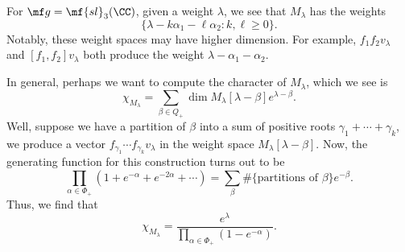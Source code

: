 \documentclass[../notes.tex]{subfiles}
\begin{document}
\begin{example}
	For $\mf g=\mf{sl}_3(\CC)$, given a weight $\lambda$, we see that $M_\lambda$ has the weights
	\[\{\lambda-k\alpha_1-\ell\alpha_2:k,\ell\ge0\}.\]
	Notably, these weight spaces may have higher dimension. For example, $f_1f_2v_\lambda$ and $[f_1,f_2]v_\lambda$ both produce the weight $\lambda-\alpha_1-\alpha_2$.
\end{example}
In general, perhaps we want to compute the character of $M_\lambda$, which we see is
\[\chi_{M_\lambda}=\sum_{\beta\in Q_+}\dim M_\lambda[\lambda-\beta]e^{\lambda-\beta}.\]
Well, suppose we have a partition of $\beta$ into a sum of positive roots $\gamma_1+\cdots+\gamma_k$, we produce a vector $f_{\gamma_1}\cdots f_{\gamma_k}v_\lambda$ in the weight space $M_\lambda[\lambda-\beta]$. Now, the generating function for this construction turns out to be
\[\prod_{\alpha\in\Phi_+}\left(1+e^{-\alpha}+e^{-2\alpha}+\cdots\right)=\sum_\beta\#\{\text{partitions of }\beta\}e^{-\beta}.\]
Thus, we find that
\[\chi_{M_\lambda}=\frac{e^\lambda}{\prod_{\alpha\in\Phi_+}\left(1-e^{-\alpha}\right)}.\]
\end{document}
